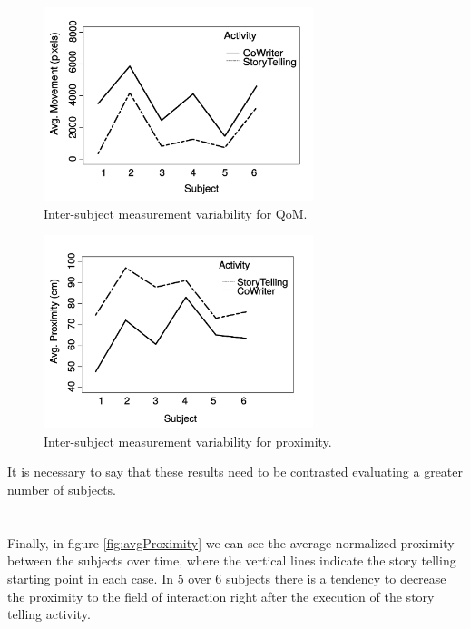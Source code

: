 \begin{figure}[h!]
        \centering
        \includegraphics[width=0.7\textwidth]{figures/AvgMovement2.pdf}
        \caption{Inter-subject measurement variability for QoM.}
		\label{fig:anovaMov}
\end{figure}

\begin{figure}[h!]
        \centering
        \includegraphics[width=0.7\textwidth]{figures/AvgProximity2.pdf}
        \caption{Inter-subject measurement variability for proximity.}
		\label{fig:anovaProx}
\end{figure}

It is necessary to say that these results need to be contrasted evaluating a greater number of subjects.
\\\\\\
Finally, in figure \ref{fig:avgProximity} we can see the average normalized proximity between the subjects over time, where the vertical lines indicate the story telling starting point in each case. In 5 over 6 subjects there is a tendency to decrease the proximity to the field of interaction right after the execution of the story telling activity.

